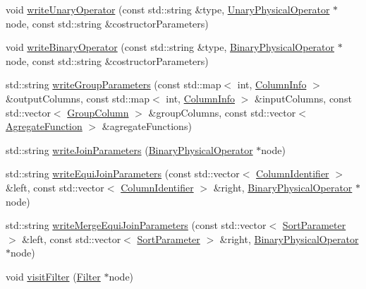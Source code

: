 \begin{DoxyCompactItemize}
\item 
void \hyperlink{class_bobox_plan_writing_physical_operator_visitor_aacdb98a45fe5a45d5f86898e4b6d4ff1}{write\+Unary\+Operator} (const std\+::string \&type, \hyperlink{class_unary_physical_operator}{Unary\+Physical\+Operator} $\ast$node, const std\+::string \&costructor\+Parameters)
\item 
void \hyperlink{class_bobox_plan_writing_physical_operator_visitor_a2a3636390a5c12828b2814ac96a46410}{write\+Binary\+Operator} (const std\+::string \&type, \hyperlink{class_binary_physical_operator}{Binary\+Physical\+Operator} $\ast$node, const std\+::string \&costructor\+Parameters)
\item 
std\+::string \hyperlink{class_bobox_plan_writing_physical_operator_visitor_a96eb34b06365296896e890123abdfa01}{write\+Group\+Parameters} (const std\+::map$<$ int, \hyperlink{class_column_info}{Column\+Info} $>$ \&output\+Columns, const std\+::map$<$ int, \hyperlink{class_column_info}{Column\+Info} $>$ \&input\+Columns, const std\+::vector$<$ \hyperlink{class_group_column}{Group\+Column} $>$ \&group\+Columns, const std\+::vector$<$ \hyperlink{class_agregate_function}{Agregate\+Function} $>$ \&agregate\+Functions)
\item 
std\+::string \hyperlink{class_bobox_plan_writing_physical_operator_visitor_a1a836021544f1e6cd117620b888819ba}{write\+Join\+Parameters} (\hyperlink{class_binary_physical_operator}{Binary\+Physical\+Operator} $\ast$node)
\item 
std\+::string \hyperlink{class_bobox_plan_writing_physical_operator_visitor_a03f4fd96dbe1a60b5e562a3e200d1263}{write\+Equi\+Join\+Parameters} (const std\+::vector$<$ \hyperlink{class_column_identifier}{Column\+Identifier} $>$ \&left, const std\+::vector$<$ \hyperlink{class_column_identifier}{Column\+Identifier} $>$ \&right, \hyperlink{class_binary_physical_operator}{Binary\+Physical\+Operator} $\ast$node)
\item 
std\+::string \hyperlink{class_bobox_plan_writing_physical_operator_visitor_a30e0f62016ad2037261b8daa69752d5f}{write\+Merge\+Equi\+Join\+Parameters} (const std\+::vector$<$ \hyperlink{class_sort_parameter}{Sort\+Parameter} $>$ \&left, const std\+::vector$<$ \hyperlink{class_sort_parameter}{Sort\+Parameter} $>$ \&right, \hyperlink{class_binary_physical_operator}{Binary\+Physical\+Operator} $\ast$node)
\item 
void \hyperlink{class_bobox_plan_writing_physical_operator_visitor_a443e89add4155e51b2d7d1973afb3af5}{visit\+Filter} (\hyperlink{class_filter}{Filter} $\ast$node)

\end{DoxyCompactItemize}
